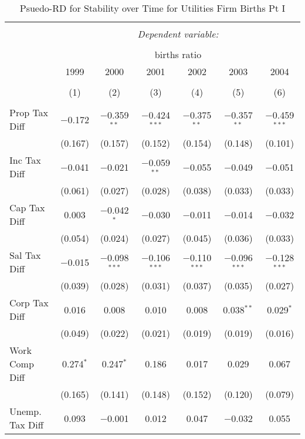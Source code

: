 
\begin{table}[!htbp] \centering 
  \caption{Psuedo-RD for Stability over Time for  Utilities Firm Births Pt I} 
  \label{22year} 
\small 
\begin{tabular}{@{\extracolsep{5pt}}lcccccc} 
\\[-1.8ex]\hline 
\hline \\[-1.8ex] 
 & \multicolumn{6}{c}{\textit{Dependent variable:}} \\ 
\cline{2-7} 
\\[-1.8ex] & \multicolumn{6}{c}{births ratio} \\ 
 & 1999 & 2000 & 2001 & 2002 & 2003 & 2004 \\ 
\\[-1.8ex] & (1) & (2) & (3) & (4) & (5) & (6)\\ 
\hline \\[-1.8ex] 
 Prop Tax Diff & $-$0.172 & $-$0.359$^{**}$ & $-$0.424$^{***}$ & $-$0.375$^{**}$ & $-$0.357$^{**}$ & $-$0.459$^{***}$ \\ 
  & (0.167) & (0.157) & (0.152) & (0.154) & (0.148) & (0.101) \\ 
  Inc Tax Diff & $-$0.041 & $-$0.021 & $-$0.059$^{**}$ & $-$0.055 & $-$0.049 & $-$0.051 \\ 
  & (0.061) & (0.027) & (0.028) & (0.038) & (0.033) & (0.033) \\ 
  Cap Tax Diff & 0.003 & $-$0.042$^{*}$ & $-$0.030 & $-$0.011 & $-$0.014 & $-$0.032 \\ 
  & (0.054) & (0.024) & (0.027) & (0.045) & (0.036) & (0.033) \\ 
  Sal Tax Diff & $-$0.015 & $-$0.098$^{***}$ & $-$0.106$^{***}$ & $-$0.110$^{***}$ & $-$0.096$^{***}$ & $-$0.128$^{***}$ \\ 
  & (0.039) & (0.028) & (0.031) & (0.037) & (0.035) & (0.027) \\ 
  Corp Tax Diff & 0.016 & 0.008 & 0.010 & 0.008 & 0.038$^{**}$ & 0.029$^{*}$ \\ 
  & (0.049) & (0.022) & (0.021) & (0.019) & (0.019) & (0.016) \\ 
  Work Comp Diff & 0.274$^{*}$ & 0.247$^{*}$ & 0.186 & 0.017 & 0.029 & 0.067 \\ 
  & (0.165) & (0.141) & (0.148) & (0.152) & (0.120) & (0.079) \\ 
  Unemp. Tax Diff & 0.093 & $-$0.001 & 0.012 & 0.047 & $-$0.032 & 0.055 \\ 

\end{tabular}
\end{table}
